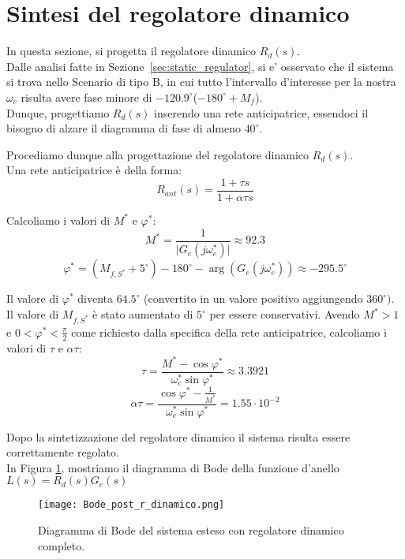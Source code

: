 \documentclass[a4paper, 11pt]{article}
\begin{document}
\clearpage
\section{Sintesi del regolatore dinamico}

In questa sezione, si progetta il regolatore dinamico $R_d(s)$. \\
%
Dalle analisi fatte in Sezione~\ref{sec:static_regulator}, si e' osservato che il sistema si trova nello Scenario di tipo B, in cui tutto l'intervallo d'interesse per la nostra $\omega_c$ risulta avere fase minore di $-120.9^{\circ}$($-180^{\circ}+M_f$). \\
Dunque, progettiamo $R_d(s)$ inserendo una rete anticipatrice, essendoci il bisogno di alzare il diagramma di fase
di almeno $40^{\circ}$. 



Procediamo dunque alla progettazione del regolatore dinamico $R_d(s)$.
\\
Una rete anticipatrice è della forma:
\[
R_{ant}(s) = \frac{1 + \tau s}{1 + \alpha \tau s}
\]

Calcoliamo i valori di \( M^* \) e \( \varphi^* \):
\[
M^* = \frac{1}{\lvert G_e(j\omega_c^*) \rvert} \approx 92.3
\]
\[
\varphi^* = (M_{f,S^*} + 5^\circ) - 180^\circ - \arg(G_e(j\omega_c^*)) \approx -295.5^\circ
\]

Il valore di $\varphi^*$ diventa $64.5^\circ$ (convertito in un valore positivo aggiungendo $360^\circ)$. \\
Il valore di \( M_{f,S^*} \) è stato aumentato di \( 5^\circ \) per essere conservativi. Avendo \( M^* > 1 \) e \( 0 < \varphi^* < \frac{\pi}{2} \) come richiesto dalla specifica della rete anticipatrice, calcoliamo i valori di \( \tau \) e \( \alpha \tau \):
\[
\tau = \frac{M^* - \cos\varphi^*}{\omega_c^* \sin\varphi^*} \approx 3.3921
\]
\[
\alpha \tau = \frac{\cos\varphi^* - \frac{1}{M^*}}{\omega_c^* \sin\varphi^*} = 1.55 \cdot 10^{-2} 
\]

Dopo la sintetizzazione del regolatore dinamico il sistema risulta essere correttamente regolato. \\
In Figura \ref{bodepostdinamic}, mostriamo il diagramma di Bode della funzione d'anello $L(s) = R_d(s) G_e(s)$


\begin{figure}[h!]
    \centering
    \texttt{[image: Bode\_post\_r\_dinamico.png]}
    \caption{Diagramma di Bode del sistema esteso con regolatore dinamico completo.}
    \label{bodepostdinamic}
\end{figure}
\end{document}
